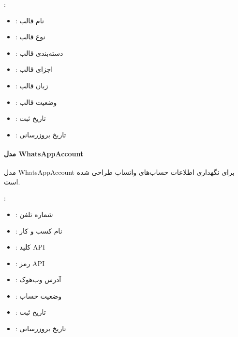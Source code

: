 \documentclass[letterpaper,10pt,english]{sphinxmanual}
\begin{document}
\sphinxAtStartPar
{}:
\begin{itemize}
\item {} 
\sphinxAtStartPar
{}: نام قالب

\item {} 
\sphinxAtStartPar
{}: نوع قالب

\item {} 
\sphinxAtStartPar
{}: دسته‌بندی قالب

\item {} 
\sphinxAtStartPar
{}: اجزای قالب

\item {} 
\sphinxAtStartPar
{}: زبان قالب

\item {} 
\sphinxAtStartPar
{}: وضعیت قالب

\item {} 
\sphinxAtStartPar
{}: تاریخ ثبت

\item {} 
\sphinxAtStartPar
{}: تاریخ بروزرسانی

\end{itemize}


\paragraph{مدل WhatsAppAccount}
\label{\detokenize{modules/whatsapp_api:whatsappaccount}}
\sphinxAtStartPar
مدل WhatsAppAccount برای نگهداری اطلاعات حساب‌های واتساپ طراحی شده است.

\sphinxAtStartPar
{}:
\begin{itemize}
\item {} 
\sphinxAtStartPar
{}: شماره تلفن

\item {} 
\sphinxAtStartPar
{}: نام کسب و کار

\item {} 
\sphinxAtStartPar
{}: کلید API

\item {} 
\sphinxAtStartPar
{}: رمز API

\item {} 
\sphinxAtStartPar
{}: آدرس وب‌هوک

\item {} 
\sphinxAtStartPar
{}: وضعیت حساب

\item {} 
\sphinxAtStartPar
{}: تاریخ ثبت

\item {} 
\sphinxAtStartPar
{}: تاریخ بروزرسانی

\end{itemize}
\end{document}
